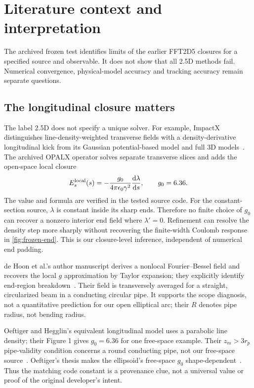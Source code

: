 \clearpage
\section{Literature context and interpretation}
\label{sec:literature}
The archived frozen test identifies limits of the earlier FFT2D5 closures for a
specified source and observable. It does not show that all 2.5D methods fail.
Numerical convergence, physical-model accuracy and tracking accuracy remain
separate questions.

\subsection{The longitudinal closure matters}
The label 2.5D does not specify a unique solver. For example, ImpactX
distinguishes line-density-weighted transverse fields with a density-derivative
longitudinal kick from its Gaussian potential-based model and full 3D
models~\cite{impactx}. The archived OPALX operator solves separate transverse slices and adds
the open-space local closure
\begin{equation}
 E_s^{\rm local}(s)=-\frac{g_0}{4\pi\epsilon_0\gamma^2}
 \frac{\mathrm d\lambda}{\mathrm d s},\qquad g_0=6.36.
 \label{eq:literature-local}
\end{equation}
The value and formula are verified in the tested source code. For the
constant-section source, $\lambda$ is constant inside its sharp ends.
Therefore no finite choice of $g_0$ can recover a nonzero interior end field
where $\lambda'=0$. Refinement can resolve the density step more sharply
without recovering the finite-width Coulomb response in \cref{fig:frozen-end}.
This is our closure-level inference, independent of numerical end padding.

de Hoon et al.'s author manuscript derives a nonlocal Fourier--Bessel field and recovers the local
$g$ approximation by Taylor expansion; they explicitly identify end-region
breakdown~\cite{dehoon}. Their field is transversely averaged for a straight,
circularized beam in a conducting circular pipe. It supports the scope
diagnosis, not a quantitative prediction for our open elliptical arc; their
$R$ denotes pipe radius, not bending radius.

Oeftiger and Hegglin's equivalent longitudinal model uses a parabolic line
density; their Figure 1 gives $g_0=6.36$ for one free-space example. Their
$z_m>3r_p$ pipe-validity condition concerns a round conducting pipe,
not our free-space source~\cite{oeftiger}.
Oeftiger's thesis makes the ellipsoid's free-space $g_0$ shape-dependent~\cite{oeftigerthesis}.
Thus the matching code constant is a provenance clue, not a universal value
or proof of the original developer's intent.

